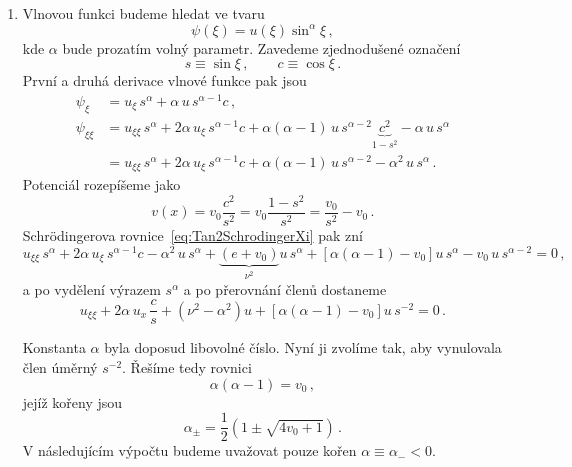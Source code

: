 \begin{solution}
\begin{enumerate}
	\item
		Vlnovou funkci budeme hledat ve tvaru
		\begin{equation}
			\label{eq:Tan2u}
			\psi(\xi)=u(\xi)\sin^{\alpha}\xi\,,
		\end{equation}
		kde $\alpha$ bude prozatím volný parametr.
		Zavedeme zjednodušené označení
		\begin{equation}
			s\equiv\sin{\xi}\,,\qquad c\equiv\cos{\xi}\,.
		\end{equation}
		První a druhá derivace vlnové funkce pak jsou
		\begin{subequations}
			\begin{align}
				\psi_{\xi}
					&=u_{\xi}\,s^{\alpha}+\alpha\,u\,s^{\alpha-1}c\,,\\
				\psi_{\xi\xi}
					&=u_{\xi\xi}\,s^{\alpha}+2\alpha\,u_{\xi}\,s^{\alpha-1}c
						+\alpha(\alpha-1)\,u\,s^{\alpha-2}\underbrace{c^{2}}_{1-s^{2}}
						-\alpha\,u\,s^{\alpha}\nonumber\\
					&=u_{\xi\xi}\,s^{\alpha}+2\alpha\,u_{\xi}\,s^{\alpha-1}c
						+\alpha(\alpha-1)\,u\,s^{\alpha-2}
						-\alpha^{2}\,u\,s^{\alpha}\,.
			\end{align}				
		\end{subequations}
		Potenciál rozepíšeme jako
		\begin{equation}
			v(x)
				=v_{0}\frac{c^{2}}{s^{2}}
				=v_{0}\frac{1-s^{2}}{s^{2}}
				=\frac{v_{0}}{s^{2}}-v_{0}\,.
		\end{equation}
		Schrödingerova rovnice~\eqref{eq:Tan2SchrodingerXi} pak zní
		\begin{equation}
			u_{\xi\xi}\,s^{\alpha}
				+2\alpha\,u_{\xi}\,s^{\alpha-1}c
				-\alpha^{2}\,u\,s^{\alpha}
				+\underbrace{\left(e+v_{0}\right)}_{\nu^{2}}u\,s^{\alpha}
				+\left[\alpha(\alpha-1)-v_{0}\right]u\,s^{\alpha}
				-v_{0}\,u\,s^{\alpha-2}=0\,,
		\end{equation}
		a po vydělení výrazem $s^{\alpha}$ a po přerovnání členů dostaneme
		\begin{equation}
			u_{\xi\xi}
				+2\alpha\,u_{x}\,\frac{c}{s}
				+\left(\nu^{2}-\alpha^{2}\right)u
				+\left[\alpha(\alpha-1)-v_{0}\right]u\,s^{-2}=0\,.
		\end{equation}
		
		Konstanta $\alpha$ byla doposud libovolné číslo.
		Nyní ji zvolíme tak, aby vynulovala člen úměrný $s^{-2}$.
		Řešíme tedy rovnici
		\begin{equation}
			\alpha(\alpha-1)=v_{0}\,,
		\end{equation}
		jejíž kořeny jsou
		\begin{equation}
			\label{eq:Tan2Alpha}
			\alpha_{\pm}=\frac{1}{2}\left(1\pm\sqrt{4v_{0}+1}\right)\,.
		\end{equation}
		V následujícím výpočtu budeme uvažovat pouze kořen $\alpha\equiv\alpha_{-}<0$.
		

\end{enumerate}
\end{solution}
